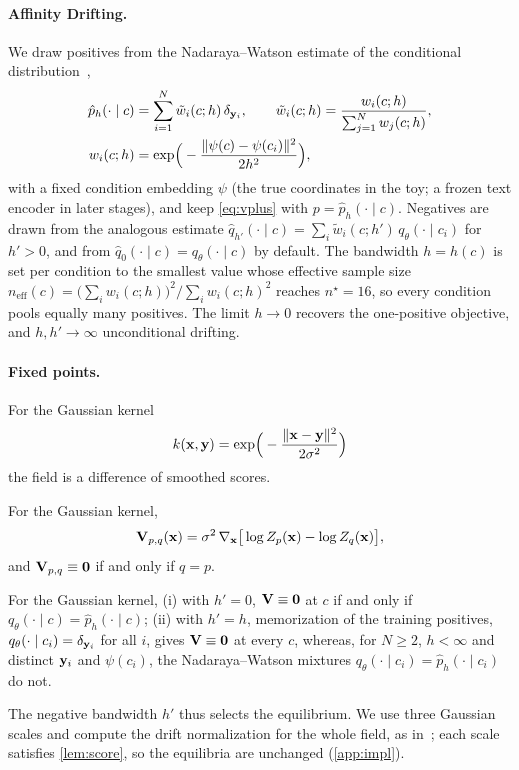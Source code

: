 \paragraph{Affinity Drifting.} We draw positives from the Nadaraya--Watson estimate of the conditional
distribution~\cite{nadaraya1964,watson1964},
\begin{align}
  \hat p_h(\cdot\mid c)&=\sum_{i=1}^N\tilde w_i(c;h)\,\delta_{\mathbf{y}_i},\qquad
  \tilde w_i(c;h)=\frac{w_i(c;h)}{\sum_{j=1}^N w_j(c;h)},\label{eq:nw}\\
  w_i(c;h)&=\exp\!\Big(-\frac{\lVert\psi(c)-\psi(c_i)\rVert^2}{2h^2}\Big),\nonumber
\end{align}
with a fixed condition embedding $\psi$ (the true coordinates in the toy; a frozen text encoder in later stages), and
keep \eqref{eq:vplus} with
$p=\hat p_h(\cdot\mid c)$. Negatives are drawn from the analogous estimate
$\hat q_{h'}(\cdot\mid c)=\sum_{i}\tilde w_i(c;h')\,q_\theta(\cdot\mid c_i)$ for $h'>0$, and from
$\hat q_0(\cdot\mid c)=q_\theta(\cdot\mid c)$ by default. The bandwidth $h=h(c)$ is set per condition to the smallest value
whose effective sample size~\cite{kish1965survey}
$n_\mathrm{eff}(c)=\big(\sum_i w_i(c;h)\big)^2/\sum_i w_i(c;h)^2$ reaches $n^\star=16$, so every condition pools
equally many positives. The limit $h\to0$ recovers the one-positive objective, and $h,h'\to\infty$ unconditional
drifting.

\paragraph{Fixed points.} For the Gaussian kernel
\begin{equation*}
  k(\mathbf{x},\mathbf{y})=\exp\!\Big(-\frac{\lVert\mathbf{x}-\mathbf{y}\rVert^2}{2\sigma^2}\Big)
\end{equation*}
the field is a difference of smoothed scores.
\begin{lemma}\label{lem:score}
For the Gaussian kernel,
\begin{equation*}
  \mathbf{V}_{p,q}(\mathbf{x})=\sigma^2\,\nabla_{\mathbf{x}}\big[\log Z_p(\mathbf{x})-\log Z_q(\mathbf{x})\big],
\end{equation*}
and $\mathbf{V}_{p,q}\equiv\mathbf 0$ if and only if $q=p$.
\end{lemma}
\begin{proposition}[Equilibria]\label{prop:fixed}
For the Gaussian kernel, (i) with $h'=0$, $\mathbf{V}\equiv\mathbf 0$ at $c$ if and only if
$q_\theta(\cdot\mid c)=\hat p_h(\cdot\mid c)$; (ii) with $h'=h$, memorization of the training positives,
$q_\theta(\cdot\mid c_i)=\delta_{\mathbf{y}_i}$ for all $i$, gives $\mathbf{V}\equiv\mathbf 0$ at every $c$, whereas, for
$N\ge2$, $h<\infty$ and distinct $\mathbf{y}_i$ and $\psi(c_i)$, the Nadaraya--Watson mixtures
$q_\theta(\cdot\mid c_i)=\hat p_h(\cdot\mid c_i)$ do not.
\end{proposition}
\noindent The negative bandwidth $h'$ thus selects the equilibrium. We use three Gaussian scales and compute the drift
normalization for the whole field, as in~\cite{deng2026drifting}; each scale satisfies \cref{lem:score}, so the
equilibria are unchanged (\cref{app:impl}).
